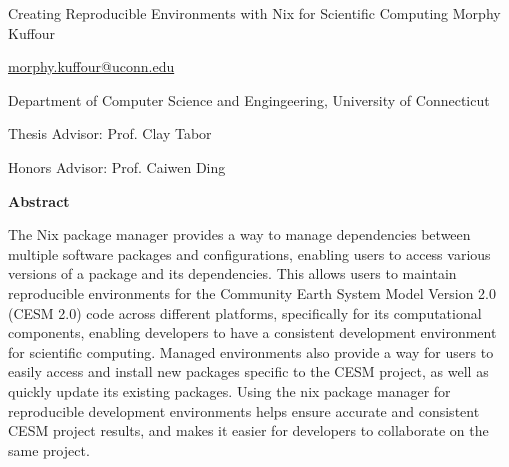 \begin{titlepage}
\centering

\vspace*{\fill}
  {\Huge Creating Reproducible Environments with Nix for Scientific Computing}
\newline
\newline
Morphy Kuffour 

\href{mailto:morphy.kuffour@uconn.edu}{morphy.kuffour@uconn.edu}

Department of Computer Science and Engingeering, University of Connecticut

Thesis Advisor: Prof. Clay Tabor

Honors Advisor: Prof. Caiwen Ding
\vspace*{\fill}

\afterpage{\blankpage}
\end{titlepage}

\vspace*{\fill}
\begin{center}
  {\large \textbf{Abstract}}
\end{center}
The Nix package manager provides a way to manage dependencies between multiple software packages and configurations, enabling users to access various versions of a package and its dependencies. This allows users to maintain reproducible environments for the Community Earth System Model Version 2.0 (CESM 2.0) code across different platforms, specifically for its computational components, enabling developers to have a consistent development environment for scientific computing. Managed environments also provide a way for users to easily access and install new packages specific to the CESM project, as well as quickly update its existing packages. Using the nix package manager for reproducible development environments helps ensure accurate and consistent CESM project results, and makes it easier for developers to collaborate on the same project.
\vspace*{\fill}

\pagebreak
